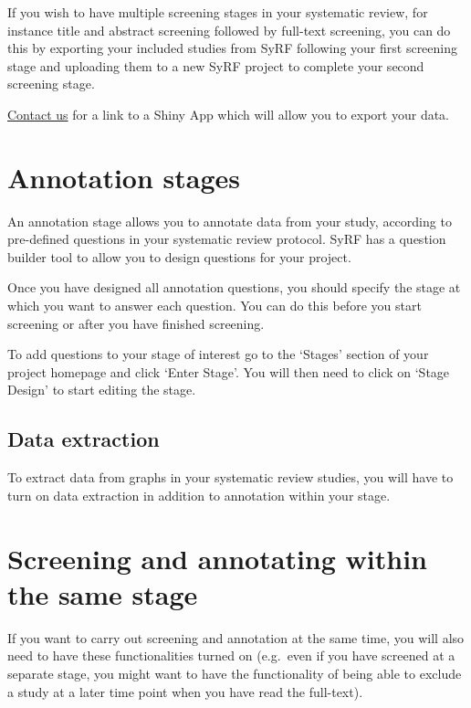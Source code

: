 \documentclass[
]{book}
\begin{document}
If you wish to have multiple screening stages in your systematic review, for instance title and abstract screening followed by full-text screening, you can do this by exporting your included studies from SyRF following your first screening stage and uploading them to a new SyRF project to complete your second screening stage.

\href{syrf.info@ed.ac.uk}{Contact us} for a link to a Shiny App which will allow you to export your data.

\hypertarget{annotation-stages}{%
\section{Annotation stages}\label{annotation-stages}}

An annotation stage allows you to annotate data from your study, according to pre-defined questions in your systematic review protocol. SyRF has a question builder tool to allow you to design questions for your project.

Once you have designed all annotation questions, you should specify the stage at which you want to answer each question. You can do this before you start screening or after you have finished screening.

To add questions to your stage of interest go to the `Stages' section of your project homepage and click `Enter Stage'. You will then need to click on `Stage Design' to start editing the stage.

\hypertarget{data-extraction-1}{%
\subsection{Data extraction}\label{data-extraction-1}}

To extract data from graphs in your systematic review studies, you will have to turn on data extraction in addition to annotation within your stage.

\hypertarget{screening-and-annotating-within-the-same-stage}{%
\section{Screening and annotating within the same stage}\label{screening-and-annotating-within-the-same-stage}}

If you want to carry out screening and annotation at the same time, you will also need to have these functionalities turned on (e.g.~even if you have screened at a separate stage, you might want to have the functionality of being able to exclude a study at a later time point when you have read the full-text).
\end{document}
